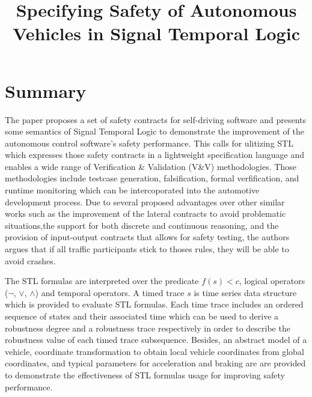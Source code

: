 \documentclass[10pt,a4paper]{report}
\title{Specifying Safety of Autonomous Vehicles in Signal Temporal Logic}
\begin{document}
\begin{center}
\textbf{\thetitle}
\end{center}


\section{Summary}
The paper proposes a set of safety contracts for self-driving software and presents some semantics of Signal Temporal Logic to demonstrate the improvement of the autonomous control software's safety performance.
%
This calls for ulitizing STL which expresses those safety contracts in a lightweight specification language and enables a wide range of Verification \& Validation (V\&V) methodologies.
%
Those methodologies include testcase generation, falsification, formal verfification, and runtime monitoring which can be intercoporated into the automotive development process.
%
Due to several proposed advantages over other similar works such as the improvement of the lateral contracts to avoid problematic situations,the support for both discrete and continuous reasoning, and the provision of input-output contracts that allows for safety testing, the authors argues that if all traffic participants stick to thoses rules, they will be able to avoid crashes.
%

The STL formulas are interpreted over the predicate $f(s) < c$, logical operators ($\neg$, $\lor$, $\land$) and temporal operators.
%
A timed trace $s$ is time series data structure which is provided to evaluate STL formulas.
%
Each time trace includes an ordered sequence of states and their associated time which can be used to derive a robustness degree and a robustness trace respectively in order to describe the robustness value of each timed trace subsequence.
%
Besides, an abstract model of a vehicle, coordinate transformation to obtain local vehicle coordinates from global coordinates, and typical parameters for acceleration and braking are are provided to demonstrate the effectiveness of STL formulas usage for improving safety performance.
\end{document}
